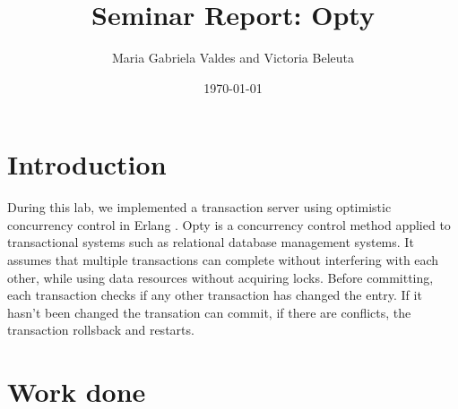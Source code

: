 \documentclass[a4paper, 11pt]{article}
\title{Seminar Report: Opty}
\author{Maria Gabriela Valdes and Victoria Beleuta}
\date{\today{}}
\begin{document}
\maketitle

\section{Introduction}

During this lab, we implemented a transaction server using optimistic concurrency control in Erlang . Opty is a concurrency control method applied to transactional systems such as relational database management systems. It assumes that multiple transactions can complete without interfering with each other, while using data resources without acquiring locks. Before committing, each transaction checks if any other transaction has changed the entry. If it hasn't been changed the transation can commit, if there are conflicts, the transaction rollsback and restarts.
 
\section{Work done}
\end{document}

